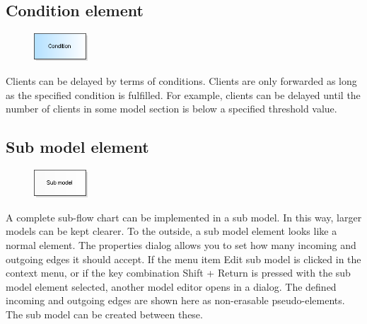 \documentclass{svmono}
\begin{document}
\subsection*{Condition element}

\begin{figure}
\vspace{-22pt}
\includegraphics[width=2cm]{IconCondition.png}
\vspace{-22pt}
\end{figure}
Clients can be delayed by terms of conditions. Clients are only forwarded as long as the specified condition is fulfilled. For example, clients can be delayed until the number of clients in some model section is below a specified threshold value.

\subsection*{Sub model element}

\begin{figure}
\vspace{-22pt}
\includegraphics[width=2cm]{IconSubModel.png}
\vspace{-22pt}
\end{figure}
A complete sub-flow chart can be implemented in a sub model. In this way, larger models can be kept clearer. To the outside, a sub model element looks like a normal element. The properties dialog allows you to set how many incoming and outgoing edges it should accept. If the menu item Edit sub model is clicked in the context menu, or if the key combination Shift + Return is pressed with the sub model element selected, another model editor opens in a dialog. The defined incoming and outgoing edges are shown here as non-erasable pseudo-elements. The sub model can be created between these.
\end{document}
